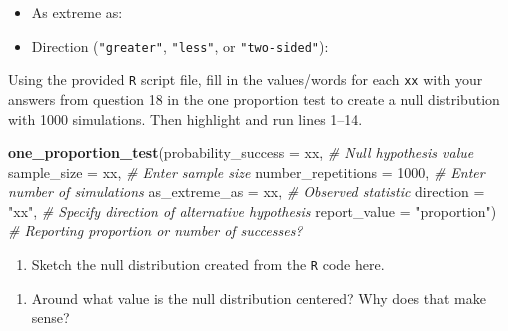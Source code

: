 \documentclass[
]{report}
\newenvironment{Shaded}{\begin{snugshade}}{\end{snugshade}}
\newcommand{\CommentTok}[1]{\textcolor[rgb]{0.56,0.35,0.01}{\textit{#1}}}
\newcommand{\DataTypeTok}[1]{\textcolor[rgb]{0.13,0.29,0.53}{#1}}
\newcommand{\DecValTok}[1]{\textcolor[rgb]{0.00,0.00,0.81}{#1}}
\newcommand{\KeywordTok}[1]{\textcolor[rgb]{0.13,0.29,0.53}{\textbf{#1}}}
\newcommand{\NormalTok}[1]{#1}
\newcommand{\StringTok}[1]{\textcolor[rgb]{0.31,0.60,0.02}{#1}}
\providecommand{\tightlist}{%
  \setlength{\itemsep}{0pt}\setlength{\parskip}{0pt}}
\begin{document}
\begin{itemize}
\tightlist
\item
  As extreme as:
\end{itemize}

\vspace{.2in}

\begin{itemize}
\tightlist
\item
  Direction (\texttt{"greater"}, \texttt{"less"}, or \texttt{"two-sided"}):
\end{itemize}

\vspace{.2in}

Using the provided \texttt{R} script file, fill in the values/words for each \texttt{xx} with your answers from question 18 in the one proportion test to create a null distribution with 1000 simulations. Then highlight and run lines 1--14.

\begin{Shaded}
\begin{Highlighting}[]
\KeywordTok{one\_proportion\_test}\NormalTok{(}\DataTypeTok{probability\_success =}\NormalTok{ xx, }\CommentTok{\# Null hypothesis value}
                    \DataTypeTok{sample\_size =}\NormalTok{ xx, }\CommentTok{\# Enter sample size}
                    \DataTypeTok{number\_repetitions =} \DecValTok{1000}\NormalTok{, }\CommentTok{\# Enter number of simulations}
                    \DataTypeTok{as\_extreme\_as =}\NormalTok{ xx, }\CommentTok{\# Observed statistic}
                    \DataTypeTok{direction =} \StringTok{"xx"}\NormalTok{, }\CommentTok{\# Specify direction of alternative hypothesis}
                    \DataTypeTok{report\_value =} \StringTok{"proportion"}\NormalTok{) }\CommentTok{\# Reporting proportion or number of successes?}
\end{Highlighting}
\end{Shaded}

\begin{enumerate}
\def\labelenumi{\arabic{enumi}.}
\setcounter{enumi}{18}
\tightlist
\item
  Sketch the null distribution created from the \texttt{R} code here.
\end{enumerate}

\vspace{1.8in}

\begin{enumerate}
\def\labelenumi{\arabic{enumi}.}
\setcounter{enumi}{19}
\tightlist
\item
  Around what value is the null distribution centered? Why does that make sense?
\end{enumerate}
\end{document}
